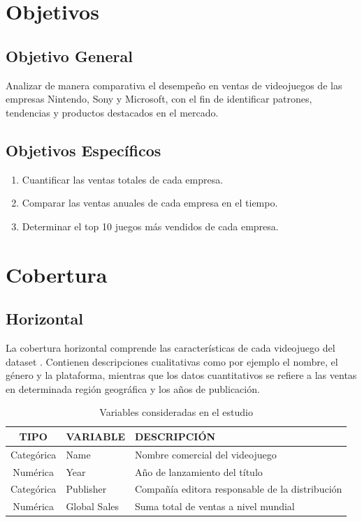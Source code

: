 \documentclass[oneside,11pt]{Latex/Classes/PhDthesisPSnPDF}
\begin{document}
\section{Objetivos}

\subsection{Objetivo General}

Analizar de manera comparativa el desempeño en ventas de videojuegos de
las empresas Nintendo, Sony y Microsoft, con el fin de identificar
patrones, tendencias y productos destacados en el mercado.

\subsection{Objetivos Específicos}
\begin{enumerate}
  \item Cuantificar las ventas totales de cada empresa.
  \item Comparar las ventas anuales de cada empresa en el tiempo.
  \item Determinar el top 10 juegos más vendidos de cada empresa.
\end{enumerate}

\section{Cobertura}

\subsection{Horizontal}

La cobertura horizontal comprende las características de cada videojuego
del dataset . Contienen descripciones cualitativas como por ejemplo el
nombre, el género y la plataforma, mientras que los datos cuantitativos
se refiere a las ventas en determinada región geográfica y los años de
publicación.

\begin{table}[ht]
\centering
\caption{Variables consideradas en el estudio} 
\resizebox{12cm}{!} {
\begin{tabular}{cll}
  \hline
  \textbf{TIPO} & \textbf{VARIABLE} & \textbf{DESCRIPCIÓN} \\ 
  \hline
  Categórica & Name & Nombre comercial del videojuego \\ 
  Numérica & Year & Año de lanzamiento del título \\ 
  Categórica & Publisher & Compañía editora responsable de la distribución \\ 
  Numérica & Global Sales & Suma total de ventas a nivel mundial \\ 
   \hline
\end{tabular}
}
\end{table}
\end{document}
